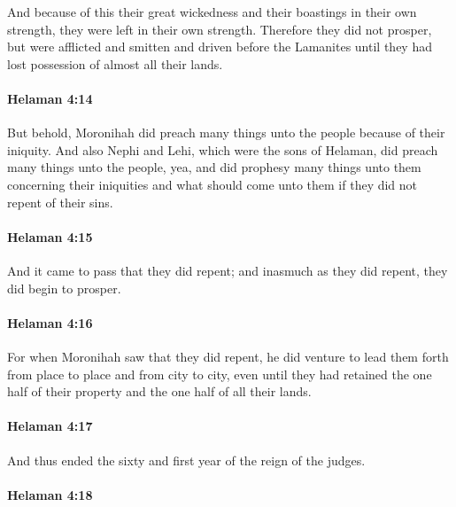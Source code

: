 			And because of this their great wickedness
			and their boastings in their own strength,
			they were left in their own strength.
			Therefore they did not prosper,
			but were afflicted and smitten and driven before the Lamanites
			until they had lost possession of almost all their lands.

		\paragraph{Helaman 4:14} %
			\label{HELAMAN-4-14}

			But behold, Moronihah did preach many things unto the people
			because of their iniquity.
			And also Nephi and Lehi, which were the sons of Helaman,
			did preach many things unto the people,
			yea, and did prophesy many things unto them concerning their iniquities
			and what should come unto them if they did not repent of their sins.

		\paragraph{Helaman 4:15} %
			\label{HELAMAN-4-15}

			And it came to pass that they did repent;
			and inasmuch as they did repent, they did begin to prosper.

		\paragraph{Helaman 4:16} %
			\label{HELAMAN-4-16}

			For when Moronihah saw that they did repent,
			he did venture to lead them forth from place to place and from city to city,
			even until they had retained the one half of their property
			and the one half of all their lands.

		\paragraph{Helaman 4:17} %
			\label{HELAMAN-4-17}

			And thus ended the sixty and first year of the reign of the judges.

		\paragraph{Helaman 4:18} %
			\label{HELAMAN-4-18}

